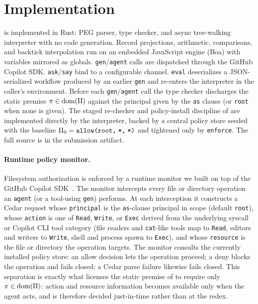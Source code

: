 \section{Implementation}
\label{sec:implementation}

\pact is implemented in Rust: PEG parser, type checker, and async tree-walking
interpreter with no code generation. Record projections, arithmetic,
comparisons, and backtick interpolation run on an embedded JavaScript engine
(Boa) with \pact variables mirrored as globals. \texttt{gen}/\texttt{agent}
calls are dispatched through the GitHub Copilot SDK. \texttt{ask}/\texttt{say}
bind to a configurable channel. \texttt{eval} deserializes a JSON-serialized
workflow produced by an earlier \texttt{gen} and re-enters the interpreter in
the caller's environment. Before each \texttt{gen}/\texttt{agent} call the type
checker discharges the static premise $\pi \in \mathrm{dom}(\Pi)$ against the
principal given by the \texttt{as} clause (or \texttt{root} when none is given).
The staged re-checker and policy-install discipline of 
are implemented directly by the interpreter, backed by a central policy store
seeded with the baseline $\Pi_0 = \texttt{allow(root,\;*,\;*)}$ and tightened
only by \texttt{enforce}. The full source is in the submission artifact.

\paragraph{Runtime policy monitor.} Filesystem authorization is enforced by a
runtime monitor we built on top of the GitHub Copilot SDK~\cite{CopilotSDKRust2026}. The monitor
intercepts every file or directory operation an \texttt{agent} (or a tool-using
\texttt{gen}) performs. At each interception it constructs a Cedar request whose
\texttt{principal} is the \texttt{as}-clause principal in scope (default
\texttt{root}), whose \texttt{action} is one of \texttt{Read}, \texttt{Write},
or \texttt{Exec} derived from the underlying syscall or Copilot CLI tool
category (file readers and \texttt{cat}-like tools map to \texttt{Read}, editors
and writers to \texttt{Write}, shell and process spawn to \texttt{Exec}), and
whose \texttt{resource} is the file or directory the operation targets. The
monitor consults the currently installed policy store: an allow decision lets
the operation proceed; a deny blocks the operation and fails closed; a Cedar parse
failure likewise fails closed. This separation is exactly what licenses the static
premise of  to require only $\pi \in \mathrm{dom}(\Pi)$:
action and resource information becomes available only when the agent acts, and
is therefore decided just-in-time rather than at the redex.

